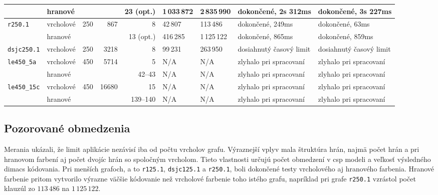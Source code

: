 \begin{table}[H]
{\begin{tabular}{|l|l|r|r|r|p{}|p{}|p{}|p{}|}
                                & hranové    &       &       & 23 (opt.) & 1\,033\,872 & 2\,835\,990 & dokončené, 2s 312ms     & dokončené, 3s 227ms     \\
            \hline
            \texttt{r250.1}     & vrcholové  & 250   & 867   & 8         & 42\,807     & 113\,486    & dokončené, 249ms        & dokončené, 63ms         \\
                                & hranové    &       &       & 13 (opt.) & 416\,285    & 1\,125\,122 & dokončené, 865ms        & dokončené, 859ms        \\
            \hline
            \texttt{dsjc250.1}  & vrcholové  & 250   & 3218  & 8         & 99\,231     & 263\,950    & dosiahnutý časový limit & dosiahnutý časový limit \\
            \hline
            \texttt{le450\_5a}  & vrcholové  & 450   & 5714  & 5         & N/A         & N/A         & zlyhalo pri spracovaní  & zlyhalo pri spracovaní  \\
                                & hranové    &       &       & 42--43    & N/A         & N/A         & zlyhalo pri spracovaní  & zlyhalo pri spracovaní  \\
            \hline
            \texttt{le450\_15c} & vrcholové  & 450   & 16680 & 15        & N/A         & N/A         & zlyhalo pri spracovaní  & zlyhalo pri spracovaní  \\
                                & hranové    &       &       & 139--140  & N/A         & N/A         & zlyhalo pri spracovaní  & zlyhalo pri spracovaní  \\
            \hline
        \end{tabular}
    }
\end{table}

\subsection{Pozorované obmedzenia}\label{sec:testing:limitations}
Merania ukázali, že limit aplikácie nezávisí iba od počtu vrcholov grafu. Výraznejší vplyv mala štruktúra hrán, najmä počet hrán a pri hranovom farbení aj počet dvojíc hrán so spoločným vrcholom. Tieto vlastnosti určujú počet obmedzení v \acrshort{csp} modeli a veľkosť výsledného \acrshort{dimacs} kódovania. Pri menších grafoch, a to \texttt{r125.1}, \texttt{dsjc125.1} a \texttt{r250.1}, boli dokončené testy vrcholového aj hranového farbenia. Hranové farbenie pritom vytvorilo výrazne väčšie kódovanie než vrcholové farbenie toho istého grafu, napríklad pri grafe \texttt{r250.1} vzrástol počet klauzúl zo $113\,486$ na $1\,125\,122$.

